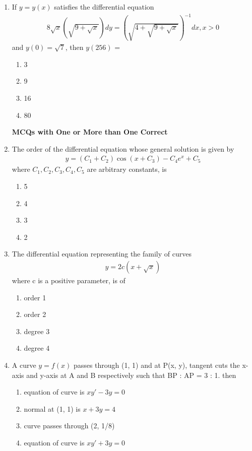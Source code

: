 \begin{enumerate}[label=\arabic*.,ref=\thesubsection.\theenumi]
\item If $y = y(x)$ satisfies the differential equation
\begin{align*}
8\sqrt{x}\left(\sqrt{9 + \sqrt{x}}\right)dy = \left(\sqrt{4 + \sqrt{9 + \sqrt{x}}}\right)^{-1}dx, x > 0
\end{align*}
and $y(0) = \sqrt{7}$, then $y(256)$ = 
\begin{enumerate}
\item 3
\item 9
\item 16
\item 80
\end{enumerate}

\textbf{MCQs with One or More than One Correct}

\item The order of the differential equation whose general solution is given by
\begin{align*}
y = (C_1 + C_2)\cos(x + C_3) - C_4e^x + C_5
\end{align*}
where $C_1, C_2, C_3, C_4, C_5$ are arbitrary constants, is
\begin{enumerate}
\item 5
\item 4
\item 3
\item 2
\end{enumerate}

\item The differential equation representing the family of curves
\begin{align*}
y = 2c\left(x + \sqrt{x}\right)
\end{align*}
where c is a positive parameter, is of
\begin{enumerate}
\item order 1
\item order 2
\item degree 3
\item degree 4
\end{enumerate}

\item A curve $y = f(x)$ passes through (1, 1) and at P(x, y), tangent cuts the x-axis and y-axis at A and B respectively such that BP : AP = 3 : 1. then
\begin{enumerate}
\item equation of curve is $xy' - 3y = 0$
\item normal at (1, 1) is $x + 3y = 4$
\item curve passes through (2, 1/8)
\item equation of curve is $xy' + 3y = 0$
\end{enumerate}


\end{enumerate}
